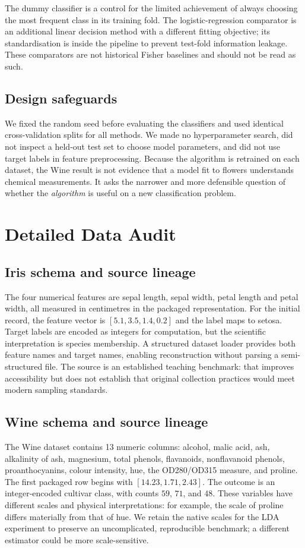 \documentclass[11pt]{article}
\begin{document}
The dummy classifier is a control for the limited achievement of always choosing the most frequent class in its training fold. The logistic-regression comparator is an additional linear decision method with a different fitting objective; its standardisation is inside the pipeline to prevent test-fold information leakage. These comparators are not historical Fisher baselines and should not be read as such.

\subsection{Design safeguards}
We fixed the random seed before evaluating the classifiers and used identical cross-validation splits for all methods. We made no hyperparameter search, did not inspect a held-out test set to choose model parameters, and did not use target labels in feature preprocessing. Because the algorithm is retrained on each dataset, the Wine result is not evidence that a model fit to flowers understands chemical measurements. It asks the narrower and more defensible question of whether the \emph{algorithm} is useful on a new classification problem.

\section{Detailed Data Audit}
\subsection{Iris schema and source lineage}
The four numerical features are sepal length, sepal width, petal length and petal width, all measured in centimetres in the packaged representation. For the initial record, the feature vector is $[5.1,3.5,1.4,0.2]$ and the label maps to setosa. Target labels are encoded as integers for computation, but the scientific interpretation is species membership. A structured dataset loader provides both feature names and target names, enabling reconstruction without parsing a semi-structured file. The source is an established teaching benchmark: that improves accessibility but does not establish that original collection practices would meet modern sampling standards.

\subsection{Wine schema and source lineage}
The Wine dataset contains 13 numeric columns: alcohol, malic acid, ash, alkalinity of ash, magnesium, total phenols, flavanoids, nonflavanoid phenols, proanthocyanins, colour intensity, hue, the OD280/OD315 measure, and proline. The first packaged row begins with $[14.23,1.71,2.43]$. The outcome is an integer-encoded cultivar class, with counts $59$, $71$, and $48$. These variables have different scales and physical interpretations: for example, the scale of proline differs materially from that of hue. We retain the native scales for the LDA experiment to preserve an uncomplicated, reproducible benchmark; a different estimator could be more scale-sensitive.
\end{document}
